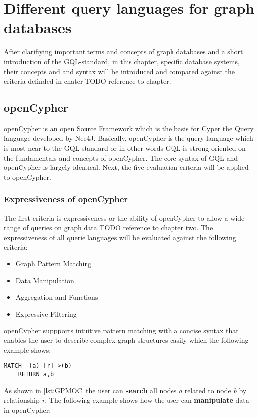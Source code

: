 \chapter{Different query languages for graph databases}
\label{ch:different_query_languages_for_graph_databases}
After clarifiying important terms and concepts of graph databases and a short introduction of the GQL-standard,
in this chapter, specific database systems, their concepts and and syntax will be introduced
and compared against the criteria definded in chater TODO reference to chapter.
\section{openCypher}
\label{sec:different_query_languages_for_graph_databases:openCypher}
openCypher is an open Source Framework which is the basis for Cyper the Query language
developed by Neo4J.
Basically, openCypher is the query language which is most near to the GQL standard
or in other words GQL is strong oriented on the fundamentals and concepts of openCypher.
The core syntax of GQL and openCypher is largely identical.
Next, the five evaluation criteria will be applied to openCypher.
\subsection{Expressiveness of openCypher}
\label{subsec:different_query_languages_for_graph_databases:openCypher:expressiveness}
The first criteria is expressiveness or the ability of openCypher to allow a wide
range of queries on graph data TODO reference to chapter two. The expressiveness
of all querie languages will be evaluated against the following criteria:

\begin{itemize}
	\item Graph Pattern Matching
	\item Data Manipulation
	\item Aggregation and Functions
	\item Expressive Filtering
\end{itemize}
openCypher suppports intuitive pattern matching with a concise syntax that enables the
user to describe complex graph structures easily which the following example shows:
\begin{lstlisting}[caption={Graph Pattern Matching in openCypher}, label={lst:GPMOC}] 
	MATCH  (a)-[r]->(b)
	RETURN a,b
\end{lstlisting} As shown in \cref{lst:GPMOC} the user can \textbf{search} all nodes \textit{a}
related to node \textit{b} by relationship \textit{r}.\newline 
The following example shows how the user can \textbf{manipulate} data in openCypher:


